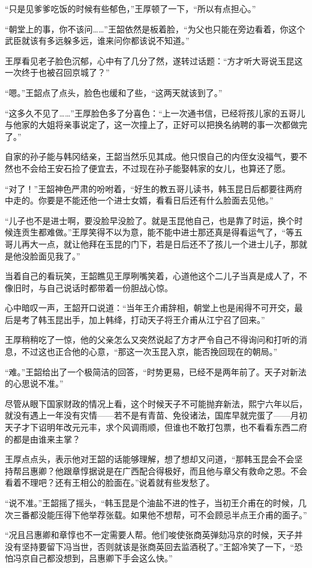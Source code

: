 “只是见爹爹吃饭的时候有些郁色，”王厚顿了一下，“所以有点担心。”

“朝堂上的事，你不该问……”王韶依然是板着脸，“为父也只能在旁边看着，你这个武臣就该有多远躲多远，谁来问你都该说不知道。”

王厚看见老子脸色沉郁，心中有了几分了然，遂转过话题：“方才听大哥说玉昆这一次终于也被召回京城了？”

“嗯。”王韶点了点头，脸色也缓和了些，“这两天就该到了。”

“这多久不见了……”王厚脸色多了分喜色：“上一次通书信，已经将孩儿家的五哥儿与他家的大姐将亲事说定了，这一次撞上了，正好可以把换名纳聘的事一次都做完了。”

自家的孙子能与韩冈结亲，王韶当然乐见其成。他只恨自己的内侄女没福气，要不然也不会给王安石捡了便宜去，不过现在孙子能娶韩家的女儿，也算还了愿。

“对了！”王韶神色严肃的吩咐着，“好生的教五哥儿读书，韩玉昆日后都要往两府中走的。你要是不能还他一个进士女婿，看看日后还有什么脸面去见他。”

“儿子也不是进士啊，要没脸早没脸了。就是玉昆他自己，也是靠了时运，换个时候连贡生都难做。”王厚笑得不以为意，能不能中进士那还真是得看运气了，“等五哥儿再大一点，就让他拜在玉昆的门下，若是日后还不了孩儿一个进士儿子，那就是他没脸面见我了。”

当着自己的看玩笑，王韶瞧见王厚咧嘴笑着，心道他这个二儿子当真是成人了，不像旧时，与自己说话时都带着一份胆战心惊。

心中暗叹一声，王韶开口说道：“当年王介甫辞相，朝堂上也是闹得不可开交，最后是考了韩玉昆出手，加上韩绛，打动天子将王介甫从江宁召了回来。”

王厚稍稍吃了一惊，他的父亲怎么又突然说起了方才严令自己不得询问和打听的消息，不过这也正合他的心意，“那这一次玉昆入京，能否挽回现在的朝局。”

“难。”王韶给出了一个极简洁的回答，“时势更易，已经不是两年前了。天子对新法的心思说不准。”

尽管从眼下国家财政的情况上看，这个时候天子不可能抛弃新法，熙宁六年以后，就没有遇上一年没有灾情——若不是有青苗、免役诸法，国库早就完蛋了——月初天子才下诏明年改元元丰，求个风调雨顺，但谁也不敢打包票，也不看看东西二府的都是由谁来主掌？

王厚点点头，表示他对王韶的话能够理解，想了想却又问道，“那韩玉昆会不会坚持帮吕惠卿？他跟章惇据说是在广西配合得极好，而且他与章父有救命之恩。不会看着不理吧？还有王相公的脸面在。”说着就有些发愁了。

“说不准。”王韶摇了摇头，“韩玉昆是个油盐不进的性子，当初王介甫在的时候，几次三番都没能压得下他举荐张载。如果他不想帮，可不会顾忌半点王介甫的面子。”

“况且吕惠卿和章惇也不一定需要人帮。他们唆使张商英弹劾冯京的时候，天子并没有坚持要留下冯当世，否则就该是张商英回去监酒税了。”王韶冷笑了一下，“恐怕冯京自己都没想到，吕惠卿下手会这么快。”

